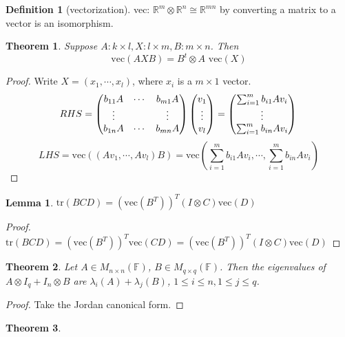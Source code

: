 \documentclass{book}
\newtheorem{theorem}{Theorem}[section]
\newtheorem{lemma}{Lemma}[section]
\theoremstyle{definition}
\newtheorem{definition}{Definition}[section]
\begin{document}
\begin{definition}[vectorization]
vec: $\mathbb{R}^{m}\otimes\mathbb{R}^{n}\cong\mathbb{R}^{mn}$ by converting a matrix to a vector is an isomorphism.
\end{definition}
\begin{theorem}
Suppose $A:k\times l, X:l\times m, B:m\times n$. Then
\[\text{vec}(AXB)=B^{t}\otimes A\text{ vec}(X)\]
\end{theorem}
\begin{proof}
Write $X=(x_1,\cdots,x_l)$, where $x_i$ is a $m\times 1$ vector.
\[
RHS=\begin{pmatrix}
 b_{11}A & \cdots & b_{m1}A\\
 \vdots &  & \vdots\\
  b_{1n}A& \cdots & b_{mn}A
\end{pmatrix}
\begin{pmatrix}
 v_1\\
 \vdots\\
v_l
\end{pmatrix}=\begin{pmatrix}
\sum_{i=1}^{m} b_{i1}Av_i \\
 \vdots \\
\sum_{i=1}^{m} b_{in}Av_i
\end{pmatrix}\\\]
\[LHS=\text{vec}((Av_1,\cdots,Av_l)B)=\text{vec}(\sum_{i=1}^{m} b_{i1}Av_i ,\cdots,\sum_{i=1}^{m} b_{in}Av_i)\]
\end{proof}
\begin{lemma}
$\text{tr}(BCD)=(\text{vec}(B^T))^T(I\otimes C)\text{vec}(D)$
\end{lemma}
\begin{proof}
$\text{tr}(BCD)=(\text{vec}(B^T))^T\text{vec}(CD)=(\text{vec}(B^T))^T(I\otimes C)\text{vec}(D)$
\end{proof}




\begin{theorem}
Let $A\in M_{n\times n}(\mathbb{F})$, $B\in M_{q\times q}(\mathbb{F})$. Then the eigenvalues of $A\otimes I_q+I_n\otimes B$ are $\lambda_i(A)+\lambda_j(B)$, $1\le i\le n, 1\le j\le q$.
\end{theorem}
\begin{proof}
Take the Jordan canonical form.
\end{proof}

\begin{theorem}

\end{theorem}
\end{document}
